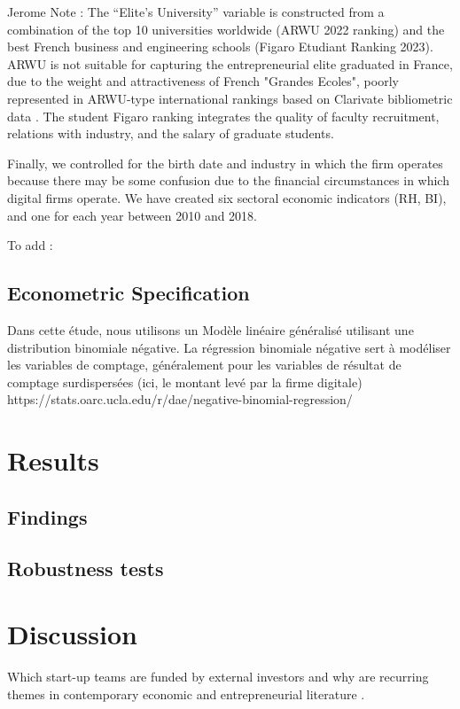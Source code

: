 \documentclass[12pt]{article}
\begin{document}
Jerome Note : The “Elite’s University” variable is constructed from a combination of the top 10 universities worldwide (ARWU 2022 ranking) and the best French business and engineering schools (Figaro Etudiant Ranking 2023). ARWU is not suitable for capturing the entrepreneurial elite graduated in France, due to the weight and attractiveness of French "Grandes Ecoles", poorly represented in ARWU-type international rankings based on Clarivate bibliometric data . The student Figaro ranking integrates the quality of faculty recruitment, relations with industry, and the salary of graduate students.

Finally, we controlled for the birth date and industry in which the firm operates because there may be some confusion due to the financial circumstances in which digital firms operate. We have created six sectoral economic indicators (RH, BI), and one for each year between 2010 and 2018.

To add : \citet{ratzinger2018impact}

\subsection{Econometric Specification}

Dans cette étude, nous utilisons un Modèle linéaire généralisé utilisant une distribution binomiale négative. La régression binomiale négative sert à modéliser les variables de comptage, généralement pour les variables de résultat de comptage surdispersées (ici, le montant levé par la firme digitale) https://stats.oarc.ucla.edu/r/dae/negative-binomial-regression/

\section{Results}

\subsection{Findings}


\subsection{Robustness tests}


\section{Discussion}

Which start-up teams are funded by external investors and why are recurring themes in contemporary economic and entrepreneurial literature \citep{baum2004picking, beckman2007early, bernstein2017attracting, franke2006you, franke2008venture, plummer2016better, kaplan2009should, shane2002network}.
\end{document}

